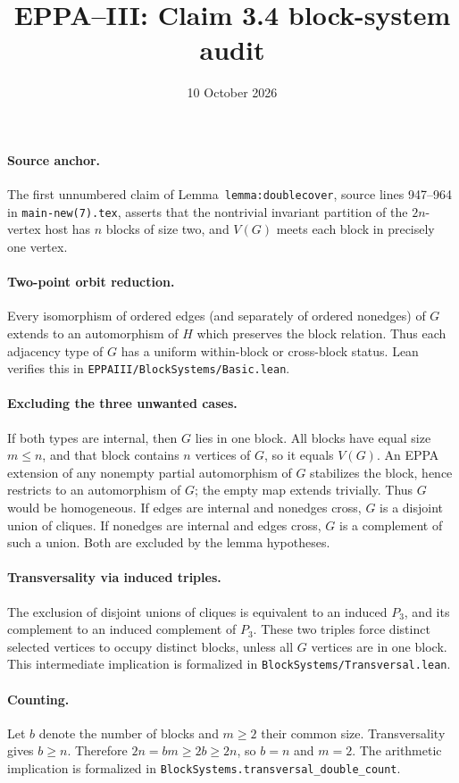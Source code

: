 \documentclass[11pt]{article}
\title{EPPA--III: Claim 3.4 block-system audit}
\date{10 October 2026}
\begin{document}
\maketitle
\paragraph{Source anchor.}
The first unnumbered claim of Lemma~\texttt{lemma:doublecover},
source lines 947--964 in \texttt{main-new(7).tex},
asserts that the nontrivial invariant partition of the
\(2n\)-vertex host has \(n\) blocks of size two,
and \(V(G)\) meets each block in precisely one vertex.
\paragraph{Two-point orbit reduction.}
Every isomorphism of ordered edges (and separately of
ordered nonedges) of \(G\) extends to an automorphism of
\(H\) which preserves the block relation. Thus each
adjacency type of \(G\) has a uniform within-block
or cross-block status. Lean verifies this in
\texttt{EPPAIII/BlockSystems/Basic.lean}.
\paragraph{Excluding the three unwanted cases.}
If both types are internal, then \(G\) lies in one block.
All blocks have equal size \(m\le n\), and that block
contains \(n\) vertices of \(G\), so it equals \(V(G)\).
An EPPA extension of any nonempty partial automorphism
of \(G\) stabilizes the block, hence restricts to
an automorphism of \(G\); the empty map extends trivially.
Thus \(G\) would be homogeneous.
If edges are internal and nonedges cross, \(G\) is
a disjoint union of cliques. If nonedges are internal
and edges cross, \(G\) is a complement of such a union.
Both are excluded by the lemma hypotheses.
\paragraph{Transversality via induced triples.}
The exclusion of disjoint unions of cliques is
equivalent to an induced \(P_3\), and its complement
to an induced complement of \(P_3\).
These two triples force distinct selected vertices
to occupy distinct blocks, unless all \(G\) vertices
are in one block. This intermediate implication is
formalized in \texttt{BlockSystems/Transversal.lean}.
\paragraph{Counting.}
Let \(b\) denote the number of blocks and
\(m\ge2\) their common size. Transversality gives
\(b\ge n\). Therefore \(2n=bm\ge2b\ge2n\),
so \(b=n\) and \(m=2\). The arithmetic implication
is formalized in
\texttt{BlockSystems.transversal\_double\_count}.
\end{document}
